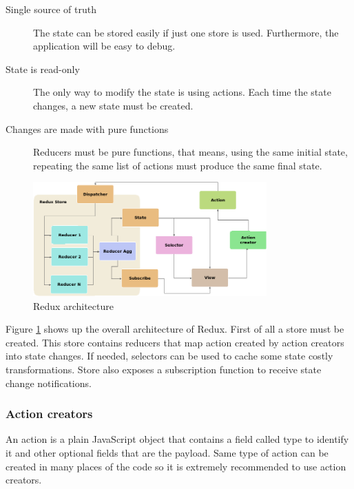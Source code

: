 \begin{description}
	\item [Single source of truth]
	The state can be stored easily if just one store is used. Furthermore, the
	application will be easy to debug.
	
	\item [State is read-only]
	The only way to modify the state is using actions. Each time the state
	changes, a new state must be created.

	\item [Changes are made with pure functions]
	Reducers must be pure functions, that means, using the same initial state,
	repeating the same list of actions must produce the same final state.

\end{description}


\begin{figure}[htb]
	\begin{center}
		\includegraphics[width=0.8\textwidth]{./figures/redux.png}
		\caption{Redux architecture}
		\label{F:redux-architecture}
	\end{center}
\end{figure}

Figure \ref{F:redux-architecture} shows up the overall architecture of 
Redux. First of all a store must be created. This store contains reducers that
map action created by action creators into state changes. If needed, selectors
can be used to cache some state costly transformations. Store also exposes a
subscription function to receive state change notifications.

\subsubsection{Action creators}

An action is a plain JavaScript object that contains a field called type to 
identify it and other optional fields that are the payload. Same type of action
can be created in many places of the code so it is extremely recommended to use
action creators.

